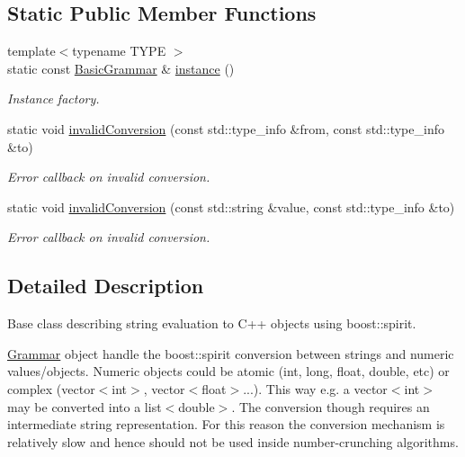 \subsection*{Static Public Member Functions}
\begin{DoxyCompactItemize}
\item 
{\footnotesize template$<$typename T\+Y\+PE $>$ }\\static const \hyperlink{class_d_d4hep_1_1_basic_grammar}{Basic\+Grammar} \& \hyperlink{class_d_d4hep_1_1_basic_grammar_a2de5e8454bc247cc84e3137d3f2cb739}{instance} ()
\begin{DoxyCompactList}\small\item\em Instance factory. \end{DoxyCompactList}\item 
static void \hyperlink{class_d_d4hep_1_1_basic_grammar_ac609599119a3a478c5701d0b18d4992a}{invalid\+Conversion} (const std\+::type\+\_\+info \&from, const std\+::type\+\_\+info \&to)
\begin{DoxyCompactList}\small\item\em Error callback on invalid conversion. \end{DoxyCompactList}\item 
static void \hyperlink{class_d_d4hep_1_1_basic_grammar_a5320dae6f06b901657f0839870a46fa1}{invalid\+Conversion} (const std\+::string \&value, const std\+::type\+\_\+info \&to)
\begin{DoxyCompactList}\small\item\em Error callback on invalid conversion. \end{DoxyCompactList}\end{DoxyCompactItemize}


\subsection{Detailed Description}
Base class describing string evaluation to C++ objects using boost\+::spirit. 

\hyperlink{class_d_d4hep_1_1_grammar}{Grammar} object handle the boost\+::spirit conversion between strings and numeric values/objects. Numeric objects could be atomic (int, long, float, double, etc) or complex (vector$<$int$>$, vector$<$float$>$...). This way e.\+g. a vector$<$int$>$ may be converted into a list$<$double$>$. The conversion though requires an intermediate string representation. For this reason the conversion mechanism is relatively slow and hence should not be used inside number-\/crunching algorithms.

